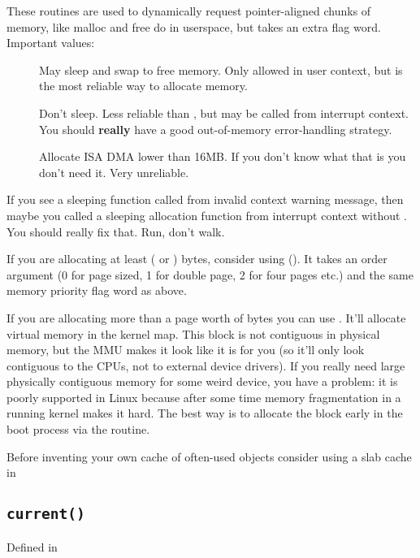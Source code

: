 \documentclass[a4paper,8pt,english]{sphinxmanual}
\begin{document}
These routines are used to dynamically request pointer-aligned chunks of
memory, like malloc and free do in userspace, but
 takes an extra flag word. Important values:
\begin{description}
\item[{}] \leavevmode
May sleep and swap to free memory. Only allowed in user context, but
is the most reliable way to allocate memory.

\item[{}] \leavevmode
Don't sleep. Less reliable than , but may be called
from interrupt context. You should \textbf{really} have a good
out-of-memory error-handling strategy.

\item[{}] \leavevmode
Allocate ISA DMA lower than 16MB. If you don't know what that is you
don't need it. Very unreliable.

\end{description}

If you see a sleeping function called from invalid context warning
message, then maybe you called a sleeping allocation function from
interrupt context without . You should really fix that.
Run, don't walk.

If you are allocating at least  ( or
) bytes, consider using 
(). It takes an order argument (0 for page sized,
1 for double page, 2 for four pages etc.) and the same memory priority
flag word as above.

If you are allocating more than a page worth of bytes you can use
. It'll allocate virtual memory in the kernel
map. This block is not contiguous in physical memory, but the MMU makes
it look like it is for you (so it'll only look contiguous to the CPUs,
not to external device drivers). If you really need large physically
contiguous memory for some weird device, you have a problem: it is
poorly supported in Linux because after some time memory fragmentation
in a running kernel makes it hard. The best way is to allocate the block
early in the boot process via the 
routine.

Before inventing your own cache of often-used objects consider using a
slab cache in 


\subsection{\texttt{current()}}
\label{kernel-hacking/hacking:current}
Defined in 
\end{document}
